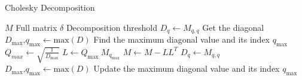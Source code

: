 \documentclass[11pt,a4paper]{article} \usepackage{float}
\begin{document}
	
\begin{algorithm}
\caption{Cholesky Decomposition}
\begin{algorithmic}[1]
\State $M$ \Comment Full matrix
\State $\delta$ \Comment Decomposition threshold
\State $D_q \gets M_{q,q}$ \Comment Get the diagonal
\State $D_{\text{max}}\text{,} q_{\text{max}} \gets \text{max}(D)$ \Comment Find the maximum diagonal value and its index $q_{\text{max}}$
	\State $Q_{max} \gets \sqrt{\frac{1}{D_{\text{max}}}}$
	\State $L \gets Q_{\text{max}} \ M_{q_{\text{max}}}$
	\State $M \gets M - LL^T$
	\State $D_q \gets M_{q,q}$
	\State $D_{\text{max}}\text{,} q_{\text{max}} \gets \text{max}(D)$ \Comment Update the maximum diagonal value and its index $q_{\text{max}}$
\EndWhile
\EndProcedure	
\end{algorithmic}
\end{algorithm}
\end{document}

